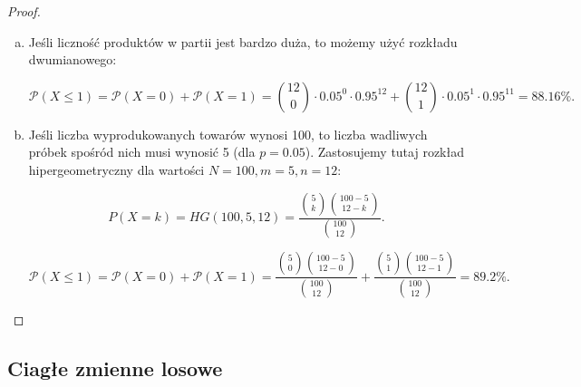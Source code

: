 \documentclass[11pt]{article}
\theoremstyle{definition}
\numberwithin{zadanie}{section}
\begin{document}
\begin{proof}
    \begin{enumerate}[a)]
        \item Jeśli liczność produktów w partii jest bardzo duża, to możemy użyć rozkładu dwumianowego:

              $$\mathcal P(X\leq 1) = \mathcal P(X=0)+\mathcal P(X=1) = \binom{12}{0}\cdot 0.05^0 \cdot 0.95^{12} + \binom{12}{1}\cdot 0.05^1 \cdot 0.95^{11} = 88.16\%.$$

        \item Jeśli liczba wyprodukowanych towarów wynosi 100, to liczba wadliwych próbek spośród nich musi wynosić 5 (dla $p=0.05$). Zastosujemy tutaj rozkład hipergeometryczny dla wartości $N=100, m=5, n=12$:
        
        $$P(X=k) = HG(100,5,12) = \frac{\binom 5k\binom{100-5}{12-k}}{\binom{100}{12}}.$$

              $$\mathcal P(X\leq 1) = \mathcal P(X=0)+\mathcal P(X=1) = \frac{\binom{5}0\binom{100-5}{12-0}}{\binom {100}{12}} +\frac{\binom{5}1\binom{100-5}{12-1}}{\binom {100}{12}}=89.2\%.$$
    \end{enumerate}
\end{proof}

\subsection{Ciagłe zmienne losowe}
\end{document}
